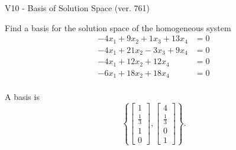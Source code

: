 \begin{exercise}
  \begin{exerciseTitle}V10 - Basis of Solution Space (ver. 761)\end{exerciseTitle}
  \begin{exerciseStatement}
    Find a basis for the solution space of the homogeneous system 
\begin{align*}
 -4 x_ 1 + 9 x_ 2 + 1 x_ 3 + 13 x_ 4 &= 0  \\ 
  -4 x_ 1 + 21 x_ 2 -3 x_ 3 + 9 x_ 4 &= 0  \\ 
  -4 x_ 1 + 12 x_ 2 + 12 x_ 4 &= 0  \\ 
  -6 x_ 1 + 18 x_ 2 + 18 x_ 4 &= 0  \\ 
 \end{align*}


 
  \end{exerciseStatement}

  \begin{exerciseAnswer}
   A basis is   
\[\left\{\left[\begin{array}{c}
1 \\
\frac{1}{3} \\
1 \\
0
\end{array}\right] , \left[\begin{array}{c}
4 \\
\frac{1}{3} \\
0 \\
1
\end{array}\right]\right\}.\]

  


  \end{exerciseAnswer}
\end{exercise}